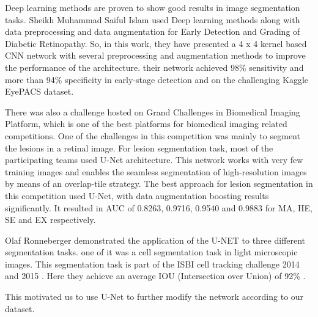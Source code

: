 \documentclass[conference]{IEEEtran}
\begin{document}
Deep learning methods are proven to show good results in image segmentation tasks. Sheikh Muhammad Saiful Islam used Deep learning methods along with data preprocessing and data augmentation for Early Detection and Grading of Diabetic Retinopathy\cite{8}. So, in this work, they have presented a 4 x 4 kernel based CNN network with several preprocessing and augmentation methods to improve the performance of the architecture. their network achieved 98\% sensitivity and more than 94\% specificity in early-stage detection and on the challenging Kaggle EyePACS dataset\cite{9}.
\par
There was also a challenge\cite{idrid} hosted on  Grand Challenges in Biomedical Imaging Platform, which is one of the best platforms for biomedical imaging related competitions. One of the challenges in this competition was mainly to segment the lesions in a retinal image. For lesion segmentation task, most of the participating teams used U-Net architecture\cite{unet}. This network works with very few training images and enables the seamless segmentation of high-resolution images by means of an overlap-tile strategy\cite{idrid}. The best approach for lesion segmentation in this competition used U-Net, with data augmentation boosting results significantly. It resulted in AUC of 0.8263, 0.9716, 0.9540 and 0.9883 for MA, HE, SE and EX respectively. 
\par
Olaf Ronneberger demonstrated the application of the U-NET to three different segmentation tasks\cite{unet}. one of it was a cell segmentation task in light microscopic images. This segmentation task is part of the ISBI cell tracking challenge 2014 and 2015 \cite{6,7}. Here they achieve an average IOU (Intersection over Union) of 92\% .
\par
This motivated us to use U-Net to further modify the network  according to our dataset.
\end{document}
